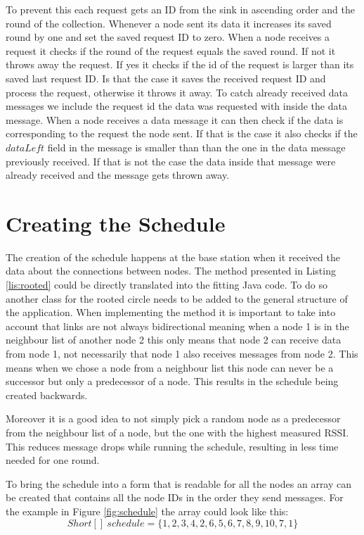 To prevent this each request gets an ID from the sink in ascending order and the round of the collection. Whenever a node sent its data it increases its saved round by one and set the saved request ID to zero. When a node receives a request it checks if the round of the request equals the saved round. If not it throws away the request. If yes it checks if the id of the request is larger than its saved last request ID. Is that the case it saves the received request ID and process the request, otherwise it throws it away. To catch already received data messages we include the request id the data was requested with inside the data message. When a node receives a data message it can then check if the data is corresponding to the request the node sent. If that is the case it also checks if the $dataLeft$ field in the message is smaller than than the one in the data message previously received. If that is not the case the data inside that message were already received and the message gets thrown away. 

\section{Creating the Schedule}
The creation of the schedule happens at the base station when it received the data about the connections between nodes. The method presented in Listing \ref{lis:rooted} could be directly translated into the fitting Java code. To do so another class for the rooted circle needs to be added to the general structure of the application. When implementing the method it is important to take into account that links are not always bidirectional meaning when a node 1 is in the neighbour list of another node 2 this only means that node 2 can receive data from node 1, not necessarily that node 1 also receives messages from node 2. This means when we chose a node from a neighbour list this node can never be a successor but only a predecessor of a node. This results in the schedule being created backwards.

Moreover it is a good idea to not simply pick a random node as a predecessor from the neighbour list of a node, but the one with the highest measured RSSI. This reduces message drops while running the schedule, resulting in less time needed for one round.  

To bring the schedule into a form that is readable for all the nodes an array can be created that contains all the node IDs in the order they send messages. For the example in Figure \ref{fig:schedule} the array could look like this: 
\[ Short[]\ schedule = \{1, 2, 3, 4, 2, 6, 5, 6, 7, 8, 9, 10, 7, 1\}\]     
